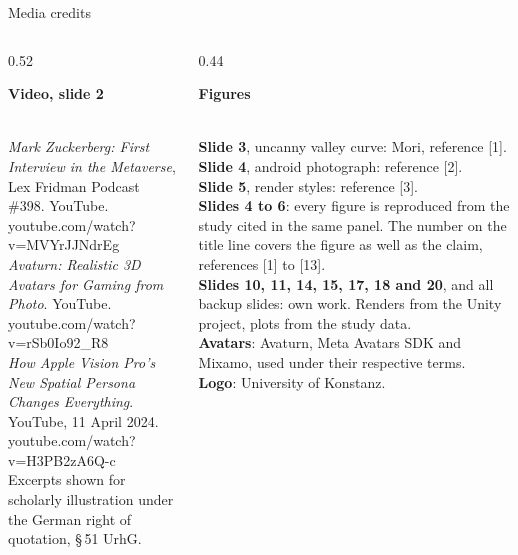 \documentclass[aspectratio=169,10pt]{beamer}
\begin{document}
\begin{frame}{Media credits}
  \vspace{0.4em}
  \footnotesize
  \begin{columns}[T]
    \begin{column}{0.52\textwidth}
      \colorbox{knlight}{\parbox{0.95\textwidth}{\color{knblue}\textbf{Video, slide 2}}}\\[0.6em]
      \scriptsize
      \textit{Mark Zuckerberg: First Interview in the Metaverse}, Lex Fridman Podcast \#398. YouTube.\\
      {\color{kngrey}youtube.com/watch?v=MVYrJJNdrEg}\\[0.6em]
      \textit{Avaturn: Realistic 3D Avatars for Gaming from Photo}. YouTube.\\
      {\color{kngrey}youtube.com/watch?v=rSb0Io92\_R8}\\[0.6em]
      \textit{How Apple Vision Pro's New Spatial Persona Changes Everything}. YouTube, 11 April 2024.\\
      {\color{kngrey}youtube.com/watch?v=H3PB2zA6Q-c}\\[0.9em]
      {\scriptsize Excerpts shown for scholarly illustration under the German right of quotation, \S\,51 UrhG.}
    \end{column}
    \begin{column}{0.44\textwidth}
      \colorbox{knlight}{\parbox{0.95\textwidth}{\color{knblue}\textbf{Figures}}}\\[0.6em]
      \scriptsize
      \textbf{Slide 3}, uncanny valley curve: Mori, reference [1].\\[0.6em]
      \textbf{Slide 4}, android photograph: reference [2].\\[0.6em]
      \textbf{Slide 5}, render styles: reference [3].\\[0.6em]
      \textbf{Slides 4 to 6}: every figure is reproduced from the study cited in the same panel. The number on the title line covers the figure as well as the claim, references [1] to [13].\\[0.6em]
      \textbf{Slides 10, 11, 14, 15, 17, 18 and 20}, and all backup slides: own work. Renders from the Unity project, plots from the study data.\\[0.6em]
      \textbf{Avatars}: Avaturn, Meta Avatars SDK and Mixamo, used under their respective terms.\\[0.6em]
      \textbf{Logo}: University of Konstanz.
    \end{column}
  \end{columns}
\end{frame}
\end{document}
